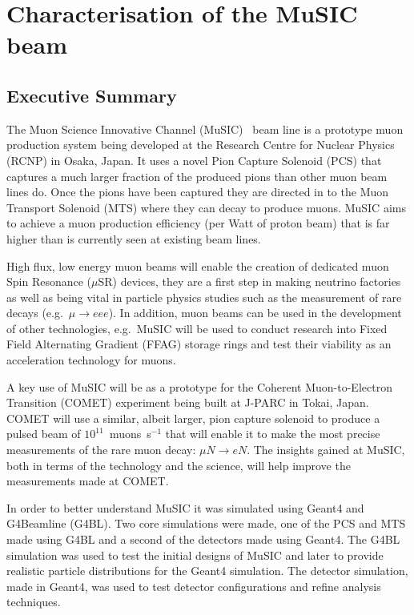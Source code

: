 \part{Characterisation of the MuSIC beam} %
\label{prt:characterisation_of_the_music_beam}

\chapter{Executive Summary} %
\label{cha:executive_summary}
The Muon Science Innovative Channel (MuSIC)~\cite{music_cdr} beam line is a prototype muon production system being developed at the Research Centre for Nuclear Physics (RCNP) in Osaka, Japan. It uses a novel Pion Capture Solenoid (PCS) that captures a much larger fraction of the produced pions than other muon beam lines do. Once the pions have been captured they are directed in to the Muon Transport Solenoid (MTS) where they can decay to produce muons. MuSIC aims to achieve a muon production efficiency (per Watt of proton beam) that is far higher than is currently seen at existing beam lines. 

High flux, low energy muon beams will enable the creation of dedicated muon Spin Resonance (\(\mu\)SR) devices, they are a first step in making neutrino factories as well as being vital in particle physics studies such as the measurement of rare decays (e.g.\ \(\mu\rightarrow eee\)). In addition, muon beams can be used in the development of other technologies, e.g.\ MuSIC will be used to conduct research into Fixed Field Alternating Gradient (FFAG) storage rings and test their viability as an acceleration technology for muons.

A key use of MuSIC will be as a prototype for the Coherent Muon-to-Electron Transition (COMET) experiment being built at J-PARC in Tokai, Japan. COMET will use a similar, albeit larger, pion capture solenoid to produce a pulsed beam of \(10^{11}\)~muons~s\(^{-1}\) that will enable it to make the most precise measurements of the rare muon decay: \(\mu N \rightarrow eN\). The insights gained at MuSIC, both in terms of the technology and the science, will help improve the measurements made at COMET. 

In order to better understand MuSIC it was simulated using Geant4 and G4Beamline (G4BL). Two core simulations were made, one of the PCS and MTS made using G4BL and a second of the detectors made using Geant4. The G4BL simulation was used to test the initial designs of MuSIC and later to provide realistic particle distributions for the Geant4 simulation. The detector simulation, made in Geant4, was used to test detector configurations and refine analysis techniques.

